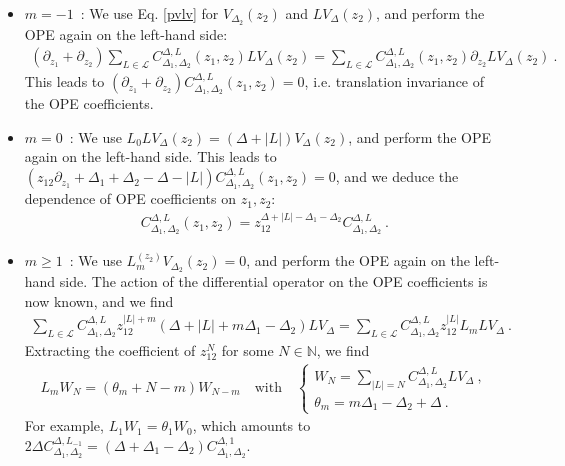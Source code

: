 \documentclass[12pt, a4paper]{article}
\begin{document}
\begin{itemize}
 \item $\boxed{m=-1}$\ : We use Eq. \eqref{pvlv} for $V_{\Delta_2}(z_2)$ and $LV_{\Delta}(z_2)$, and perform the OPE again on the left-hand side:
 \begin{align}
 \left(\partial_{z_1}+\partial_{z_2}\right) \sum_{L\in \mathcal{L}} C_{\Delta_1,\Delta_2}^{\Delta, L}(z_1,z_2)LV_\Delta(z_2) = \sum_{L\in \mathcal{L}} C_{\Delta_1,\Delta_2}^{\Delta, L}(z_1,z_2)\partial_{z_2} LV_\Delta(z_2) \ .
 \end{align}
 This leads to $(\partial_{z_1}+\partial_{z_2})C^{\Delta,L}_{\Delta_1,\Delta_2}(z_1,z_2)=0$, i.e. translation invariance of the OPE coefficients.
 \item $\boxed{m=0}$\ : We use $L_0LV_{\Delta}(z_2)= (\Delta+|L|) V_{\Delta}(z_2)$, and perform the OPE again on the left-hand side. This leads to $(z_{12}\partial_{z_1}+\Delta_1+\Delta_2-\Delta-|L|)C^{\Delta,L}_{\Delta_1,\Delta_2}(z_1,z_2) = 0$, and we deduce the dependence of OPE coefficients on $z_1,z_2$:
 \begin{align}
  C^{\Delta,L}_{\Delta_1,\Delta_2}(z_1,z_2) = z_{12}^{\Delta+|L|-\Delta_1-\Delta_2} C^{\Delta,L}_{\Delta_1,\Delta_2}\ . 
 \end{align}
\item $\boxed{m\geq 1}$\ : We use $L_m^{(z_2)}V_{\Delta_2}(z_2)=0$, and perform the OPE again on the left-hand side. The action of the differential operator on the OPE coefficients is now known, and we find 
\begin{align}
 \sum_{L\in\mathcal{L}} C^{\Delta,L}_{\Delta_1,\Delta_2}z_{12}^{|L|+m}(\Delta+|L|+m\Delta_1-\Delta_2) LV_{\Delta}= \sum_{L\in\mathcal{L}} C^{\Delta,L}_{\Delta_1,\Delta_2}z_{12}^{|L|}L_m LV_{\Delta}\ .
\end{align}
Extracting the coefficient of $z_{12}^N$ for some $N\in\mathbb{N}$, we find 
\begin{align}
 L_m W_N = \left(\theta_{m}+N-m\right)W_{N-m} \quad \text{with} \quad \left\{\begin{array}{l} W_N = \sum_{|L|=N}C^{\Delta,L}_{\Delta_1,\Delta_2} LV_{\Delta}\ , \\  \theta_{m} = m\Delta_1-\Delta_2 + \Delta\ . \end{array}\right.
 \label{opew}
\end{align}
For example, $L_1W_1 = \theta_1 W_0$, which amounts to $2\Delta C^{\Delta,L_{-1}}_{\Delta_1,\Delta_2} = (\Delta+\Delta_1-\Delta_2) C^{\Delta,1}_{\Delta_1,\Delta_2}$.
\end{itemize}
\end{document}
